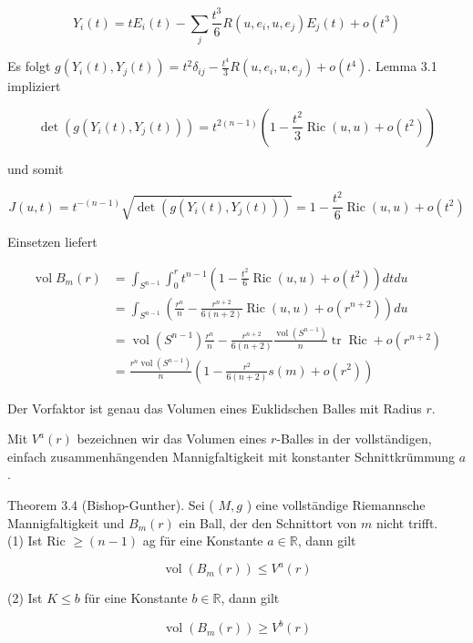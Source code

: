 \documentclass[10pt, letterpaper]{article}
\begin{document}
$$
Y_{i}(t)=t E_{i}(t)-\sum_{j} \frac{t^{3}}{6} R\left(u, e_{i}, u, e_{j}\right) E_{j}(t)+o\left(t^{3}\right)
$$

Es folgt $g\left(Y_{i}(t), Y_{j}(t)\right)=t^{2} \delta_{i j}-\frac{t^{4}}{3} R\left(u, e_{i}, u, e_{j}\right)+o\left(t^{4}\right)$. Lemma 3.1 impliziert

$$
\operatorname{det}\left(g\left(Y_{i}(t), Y_{j}(t)\right)\right)=t^{2(n-1)}\left(1-\frac{t^{2}}{3} \operatorname{Ric}(u, u)+o\left(t^{2}\right)\right)
$$

und somit

$$
J(u, t)=t^{-(n-1)} \sqrt{\operatorname{det}\left(g\left(Y_{i}(t), Y_{j}(t)\right)\right)}=1-\frac{t^{2}}{6} \operatorname{Ric}(u, u)+o\left(t^{2}\right)
$$

Einsetzen liefert

$$
\begin{aligned}
\operatorname{vol} B_{m}(r) & =\int_{S^{n-1}} \int_{0}^{r} t^{n-1}\left(1-\frac{t^{2}}{6} \operatorname{Ric}(u, u)+o\left(t^{2}\right)\right) d t d u \\
& =\int_{S^{n-1}}\left(\frac{r^{n}}{n}-\frac{r^{n+2}}{6(n+2)} \operatorname{Ric}(u, u)+o\left(r^{n+2}\right)\right) d u \\
& =\operatorname{vol}\left(S^{n-1}\right) \frac{r^{n}}{n}-\frac{r^{n+2}}{6(n+2)} \frac{\operatorname{vol}\left(S^{n-1}\right)}{n} \operatorname{tr} \operatorname{Ric}+o\left(r^{n+2}\right) \\
& =\frac{r^{n} \operatorname{vol}\left(S^{n-1}\right)}{n}\left(1-\frac{r^{2}}{6(n+2)} s(m)+o\left(r^{2}\right)\right)
\end{aligned}
$$

Der Vorfaktor ist genau das Volumen eines Euklidschen Balles mit Radius $r$.

Mit $V^{a}(r)$ bezeichnen wir das Volumen eines $r$-Balles in der vollständigen, einfach zusammenhängenden Mannigfaltigkeit mit konstanter Schnittkrümmung $a$.

Theorem 3.4 (Bishop-Gunther). Sei ( $M, g$ ) eine vollständige Riemannsche Mannigfaltigkeit und $B_{m}(r)$ ein Ball, der den Schnittort von $m$ nicht trifft.\\
(1) Ist Ric $\geq(n-1)$ ag für eine Konstante $a \in \mathbb{R}$, dann gilt

$$
\operatorname{vol}\left(B_{m}(r)\right) \leq V^{a}(r)
$$

(2) Ist $K \leq b$ für eine Konstante $b \in \mathbb{R}$, dann gilt

$$
\operatorname{vol}\left(B_{m}(r)\right) \geq V^{b}(r)
$$
\end{document}
